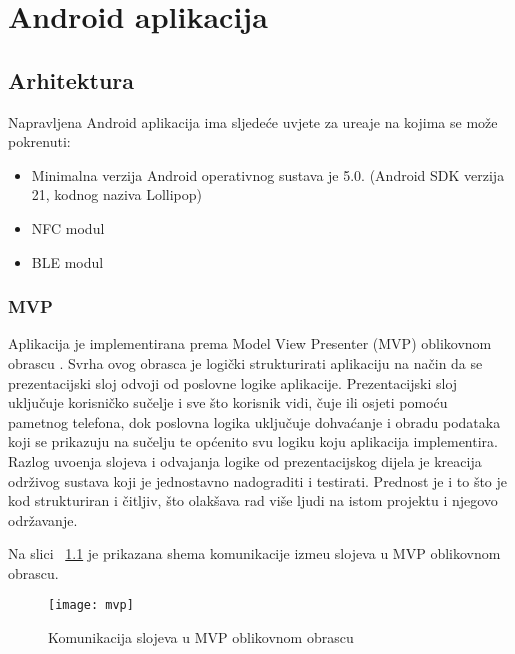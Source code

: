 
\chapter{Android aplikacija}

\section{Arhitektura}

Napravljena Android aplikacija ima sljede\'{c}e uvjete za ure\dj aje na kojima se mo\v{z}e pokrenuti:

\begin{itemize}
		\item Minimalna verzija Android operativnog sustava je 5.0. (Android SDK verzija 21, kodnog naziva Lollipop)
		\item NFC modul
		\item BLE modul
\end{itemize}

\subsection{MVP}

Aplikacija je implementirana prema Model View Presenter (MVP) oblikovnom obrascu \cite{mvp}. Svrha ovog obrasca je logi\v{c}ki strukturirati aplikaciju na na\v{c}in da se prezentacijski sloj odvoji od poslovne logike aplikacije. Prezentacijski sloj uklju\v{c}uje korisni\v{c}ko su\v{c}elje i sve \v{s}to korisnik vidi, \v{c}uje ili osjeti pomo\'{c}u pametnog telefona, dok poslovna logika uklju\v{c}uje dohva\'{c}anje i obradu podataka koji se prikazuju na su\v{c}elju te op\'{c}enito svu logiku koju aplikacija implementira. Razlog uvo\dj enja slojeva i odvajanja logike od prezentacijskog dijela je kreacija odr\v{z}ivog sustava koji je jednostavno nadograditi i testirati. Prednost je i to \v{s}to je kod strukturiran i \v{c}itljiv, \v{s}to olak\v{s}ava rad vi\v{s}e ljudi na istom projektu i njegovo odr\v{z}avanje.

Na slici ~\ref{fig:mvp} je prikazana shema komunikacije izme\dj u slojeva u MVP oblikovnom obrascu.

\begin{figure}[!htbp]
	\begin{center}
 \texttt{[image: mvp]}
 \caption{Komunikacija slojeva u MVP oblikovnom obrascu}
 \label{fig:mvp}
	\end{center}
\end{figure}

